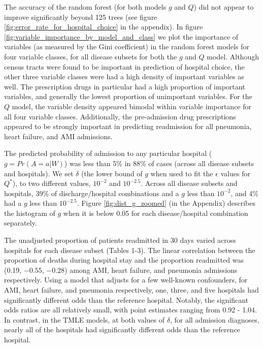 \documentclass[]{article}\usepackage[]{graphicx}\usepackage[]{color}
\begin{document}
The accuracy of the random forest (for both models $g$ and $Q$) did not appear to improve significantly beyond 125 trees (see figure \ref{fig:error_rate_for_hospital_choice} in the appendix). In figure \ref{fig:variable_importance_by_model_and_class} we plot the importance of variables (as measured by the Gini coefficient) in the random forest models for four variable classes, for all disease subsets for both the $g$ and $Q$ model. Although census tracts were found to be important in prediction of hospital choice,  the other three variable classes were had a high density of important variables as well. The prescription drugs in particular had a high proportion of important variables, and generally the lowest proportion of unimportant variables. For the $Q$ model, the variable density appeared bimodal within variable importance for all four variable classes. Additionally, the pre-admission drug prescriptions appeared to be strongly important in predicting readmission for all pneumonia, heart failure, and AMI admissions.

The predicted probability of admission to any particular hospital ($g=Pr(A=a|W)$) was less than 5\% in 88\% of cases (across all disease subsets and hospitals).  We set $\delta$ (the lower bound of $g$ when used to fit the $\epsilon$ values for $Q^*$), to two different values, $10^{-2}$ and $10^{-2.5}$. Across all disease subsets and hospitals, 39\% of discharge/hospital combinations and a $g$ less than $10^{-2}$, and 4\% had a $g$ less than $10^{-2.5}$. Figure \ref{fig:dist_g_zoomed} (in the Appendix) describes the histogram of $g$ when it is below 0.05 for each disease/hospital combination separately. 

The unadjusted proportion of patients readmitted in 30 days varied across hospitals for each disease subset (Tables 1-3). The linear correlation between the proportion of deaths during hospital stay and the proportion readmitted was (0.19, \ensuremath{-0.55}, \ensuremath{-0.28}) among AMI, heart failure, and pneumonia admissions respectively. Using a model that adjusts for a few well-known confounders, for AMI, heart failure, and pneumonia respectively, one, three, and five hospitals had significantly different odds than the reference hospital. Notably, the significant odds ratios are all relatively small, with point estimates ranging from 0.92 - 1.04. In contrast, in the TMLE models, at both values of $\delta$, for all admission diagnoses, nearly all of the hospitals had significantly different odds than the reference hospital.
\end{document}

